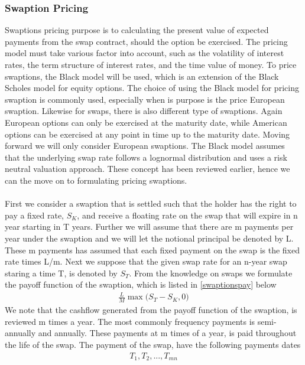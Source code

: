 \subsubsection{Swaption Pricing}
Swaptions pricing purpose is to calculating the present value of expected payments from the swap contract,
should the option be exercised. The pricing model must take various factor into account, such as the
volatility of interest rates, the term structure of interest rates, and the time value of money. 
To price swaptions, the Black model will be used, which is an extension of the Black Scholes
model for equity options. The choice of using the Black model for pricing swaption is commonly used, especially when
is purpose is the price European swaption. Likewise for swaps, there is also different type of swaptions. 
Again European options can only be exercised at the maturity date, while American options can be exercised
at any point in time up to the maturity date. Moving forward we will only consider European swaptions. 
The Black model assumes that the underlying swap rate follows a lognormal distribution and uses a 
risk neutral valuation approach. These concept has been reviewed earlier, hence we can the move on to 
formulating pricing swaptions.
\\\\
First we consider a swaption that is settled such that the holder has the right to pay a fixed rate, $S_K$, 
and receive a floating rate on the swap that will expire in n year starting in T years.
Further we will assume that there are m payments 
per year under the swaption and we will let the notional principal be denoted by L. These m payments has
assumed that each fixed payment on the swap is the fixed rate times L/m. Next we suppose that 
the given swap rate for an n-year swap staring a time T, is denoted by $S_T$. 
From the knowledge on swaps we formulate the payoff function of the swaption, which is listed in
\autoref{swaptionspay} below
\begin{align}
    \frac{L}{M} \max \Big( S_T - S_K, 0 \Big)
    \label{swaptionspay}
\end{align}
We note that the cashflow generated from the payoff function of the swaption, is reviewed m times 
a year. The most commonly frequency payments is semi-annually and annually. These payments at m times
of a year, is paid throughout the life of the swap. The payment of the swap, have the following 
payments dates 
\begin{align*}
    T_1,T_2,...,T_{mn}
\end{align*}
